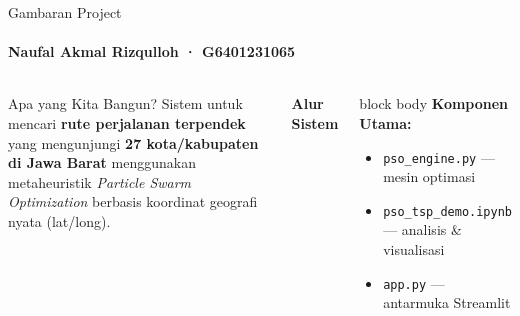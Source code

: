 \documentclass[aspectratio=169,10pt]{beamer}
\newcommand{\sectiontitle}[1]{%
  {\large\bfseries #1}%
}
\begin{document}
\begin{frame}{Gambaran Project}
  \framesubtitle{Naufal Akmal Rizqulloh · G6401231065}
  \begin{columns}[T,totalwidth=\textwidth]
    \begin{block}{Apa yang Kita Bangun?}
      \small
      Sistem untuk mencari \textbf{rute perjalanan terpendek}
      yang mengunjungi \textbf{27 kota/kabupaten di Jawa Barat}
      menggunakan metaheuristik \textit{Particle Swarm Optimization}
      berbasis koordinat geografi nyata (lat/long).
    \end{block}

    \vspace{0.25cm}
    \sectiontitle{Alur Sistem}
    \vspace{0.18cm}


    \begin{beamercolorbox}[wd=\linewidth,sep=8pt,rounded=true]{block body}
      \textbf{Komponen Utama:}
      \begin{itemize}\small
        \item \texttt{pso\_engine.py} --- mesin optimasi
        \item \texttt{pso\_tsp\_demo.ipynb} --- analisis \& visualisasi
        \item \texttt{app.py} --- antarmuka Streamlit
      \end{itemize}
    \end{beamercolorbox}


\end{columns}
\end{frame}
\end{document}
